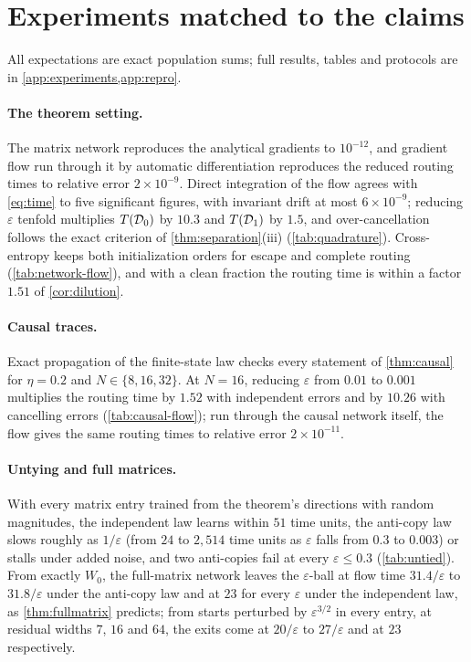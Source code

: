 \section{Experiments matched to the claims}
\label{sec:numerics}

All expectations are exact population sums; full results, tables and protocols are in \cref{app:experiments,app:repro}.

\paragraph{The theorem setting.} The matrix network reproduces the analytical gradients to $10^{-12}$, and gradient flow run through it by automatic differentiation
reproduces the reduced routing times to relative error $2\times10^{-9}$. Direct integration of the flow agrees with \cref{eq:time} to five significant figures, with invariant drift at most $6\times10^{-9}$;
reducing $\varepsilon$ tenfold multiplies $T(\mathcal D_{0})$ by $10.3$ and $T(\mathcal D_{1})$ by $1.5$, and over-cancellation follows the exact criterion of
\cref{thm:separation}(iii) (\cref{tab:quadrature}). Cross-entropy keeps both initialization orders for escape and complete routing
(\cref{tab:network-flow}), and with a clean fraction the routing time is within a factor $1.51$ of \cref{cor:dilution}.

\paragraph{Causal traces.} Exact propagation of the finite-state law checks every statement of \cref{thm:causal} for $\eta=0.2$ and $N\in\{8,16,32\}$.
At $N=16$, reducing $\varepsilon$ from $0.01$ to $0.001$ multiplies the routing time by $1.52$ with independent errors and by $10.26$ with cancelling errors (\cref{tab:causal-flow});
run through the causal network itself, the flow gives the same routing times to relative error $2\times10^{-11}$.

\paragraph{Untying and full matrices.} With every matrix entry trained from the theorem's directions with random magnitudes, the independent law learns
within $51$ time units, the anti-copy law slows roughly as $1/\varepsilon$ (from $24$ to $2{,}514$ time units as $\varepsilon$ falls from $0.3$ to $0.003$) or stalls under
added noise, and two anti-copies fail at every $\varepsilon\le0.3$ (\cref{tab:untied}). From exactly $W_0$, the full-matrix network leaves the $\varepsilon$-ball at flow time
$31.4/\varepsilon$ to $31.8/\varepsilon$ under the anti-copy law and at $23$ for every $\varepsilon$ under the independent law, as \cref{thm:fullmatrix} predicts; from starts perturbed by
$\varepsilon^{3/2}$ in every entry, at residual widths $7$, $16$ and $64$, the exits come at $20/\varepsilon$ to $27/\varepsilon$ and at $23$ respectively.

